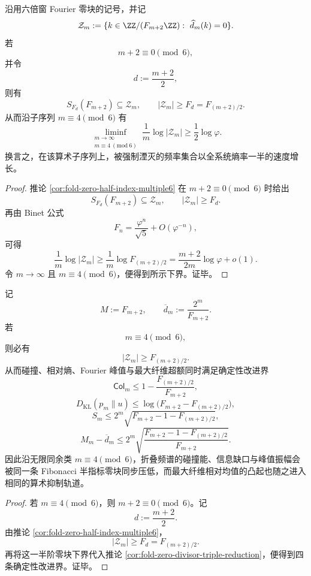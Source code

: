 \begin{theorem}[六倍窗的半熵禁带]\label{thm:conclusion-half-entropy-forbidden-band}
沿用六倍窗 Fourier 零块的记号，并记
\[
\mathcal Z_m:=\{k\in \ZZ/(F_{m+2}\ZZ):\ \widehat d_m(k)=0\}.
\]
若
\[
m+2\equiv 0\pmod 6,
\]
并令
\[
d:=\frac{m+2}{2},
\]
则有
\[
S_{F_d}(F_{m+2})\subseteq \mathcal Z_m,
\qquad
|\mathcal Z_m|\ge F_d=F_{(m+2)/2}.
\]
从而沿子序列 \(m\equiv 4\pmod 6\) 有
\[
\liminf_{\substack{m\to\infty\\ m\equiv 4\ (\mathrm{mod}\ 6)}}
\frac{1}{m}\log |\mathcal Z_m|
\ge \frac12\log\varphi.
\]
换言之，在该算术子序列上，被强制湮灭的频率集合以全系统熵率一半的速度增长。
\end{theorem}
\begin{proof}
推论 \ref{cor:fold-zero-half-index-multiple6} 在 \(m+2\equiv 0\pmod 6\) 时给出
\[
S_{F_d}(F_{m+2})\subseteq \mathcal Z_m,
\qquad
|\mathcal Z_m|\ge F_d.
\]
再由 Binet 公式
\[
F_n=\frac{\varphi^n}{\sqrt5}+O(\varphi^{-n}),
\]
可得
\[
\frac{1}{m}\log |\mathcal Z_m|
\ge
\frac{1}{m}\log F_{(m+2)/2}
=
\frac{m+2}{2m}\log\varphi+o(1).
\]
令 \(m\to\infty\) 且 \(m\equiv 4\pmod 6\)，便得到所示下界。证毕。
\end{proof}

\begin{theorem}[六周期窗口上的确定性三重下压律]\label{thm:conclusion-sixperiod-deterministic-triple-downshift}
记
\[
M:=F_{m+2},
\qquad
\overline d_m:=\frac{2^m}{F_{m+2}}.
\]
若
\[
m\equiv 4\pmod 6,
\]
则必有
\[
|\mathcal Z_m|\ge F_{(m+2)/2}.
\]
从而碰撞、相对熵、Fourier 峰值与最大纤维超额同时满足确定性改进界
\[
\mathsf{Col}_m\le 1-\frac{F_{(m+2)/2}}{F_{m+2}},
\]
\[
D_{\mathrm{KL}}(p_m\|u)\le \log\!\bigl(F_{m+2}-F_{(m+2)/2}\bigr),
\]
\[
S_m\le 2^m\sqrt{F_{m+2}-1-F_{(m+2)/2}},
\]
\[
M_m-\overline d_m\le
2^m\sqrt{\frac{F_{m+2}-1-F_{(m+2)/2}}{F_{m+2}}}.
\]
因此沿无限同余类 \(m\equiv 4\pmod 6\)，折叠频谱的碰撞能、信息缺口与峰值振幅会被同一条 Fibonacci 半指标零块同步压低，而最大纤维相对均值的凸起也随之进入相同的算术抑制轨道。
\end{theorem}
\begin{proof}
若 \(m\equiv 4\pmod 6\)，则 \(m+2\equiv 0\pmod 6\)。记
\[
d:=\frac{m+2}{2}.
\]
由推论 \ref{cor:fold-zero-half-index-multiple6}，
\[
|\mathcal Z_m|\ge F_d=F_{(m+2)/2}.
\]
再将这一半阶零块下界代入推论 \ref{cor:fold-zero-divisor-triple-reduction}，便得到四条确定性改进界。证毕。
\end{proof}

